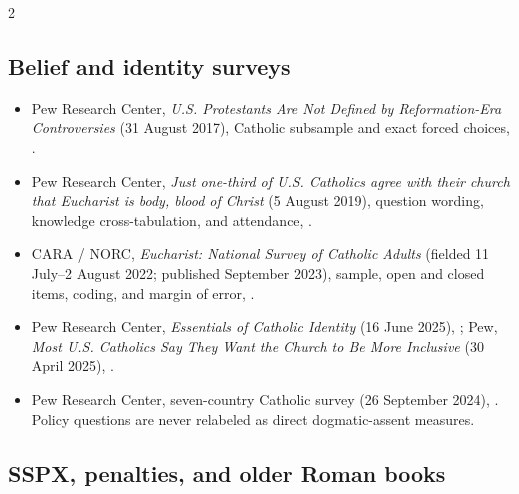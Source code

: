 \begin{multicols}{2}
\subsection*{Belief and identity surveys}

{\footnotesize
\begin{itemize}[itemsep=0.1em,topsep=0.15em]
\item Pew Research Center, \emph{U.S. Protestants Are Not Defined by Reformation-Era Controversies} (31 August 2017), Catholic subsample and exact forced choices, .
\item Pew Research Center, \emph{Just one-third of U.S. Catholics agree with their church that Eucharist is body, blood of Christ} (5 August 2019), question wording, knowledge cross-tabulation, and attendance, .
\item CARA / NORC, \emph{Eucharist: National Survey of Catholic Adults} (fielded 11 July--2 August 2022; published September 2023), sample, open and closed items, coding, and margin of error, .
\item Pew Research Center, \emph{Essentials of Catholic Identity} (16 June 2025), ; Pew, \emph{Most U.S. Catholics Say They Want the Church to Be More Inclusive} (30 April 2025), .
\item Pew Research Center, seven-country Catholic survey (26 September 2024), . Policy questions are never relabeled as direct dogmatic-assent measures.
\end{itemize}}

\subsection*{SSPX, penalties, and older Roman books}


\end{multicols}
